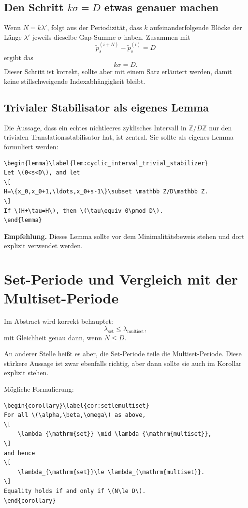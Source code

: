 \documentclass[11pt]{article}
\newcommand{\todo}[1]{\par\medskip\noindent\textbf{Empfehlung.} #1\par\medskip}
\begin{document}
\subsection{Den Schritt \texorpdfstring{\(k\sigma=D\)}{k sigma = D} etwas genauer machen}

Wenn \(N=k\lambda'\), folgt aus der Periodizität, dass \(k\) aufeinanderfolgende Blöcke der Länge \(\lambda'\) jeweils dieselbe Gap-Summe \(\sigma\) haben. Zusammen mit
\[
    \tilde p_s^{(i+N)}-\tilde p_s^{(i)}=D
\]
ergibt das
\[
    k\sigma=D.
\]
Dieser Schritt ist korrekt, sollte aber mit einem Satz erläutert werden, damit keine stillschweigende Indexabhängigkeit bleibt.

\subsection{Trivialer Stabilisator als eigenes Lemma}

Die Aussage, dass ein echtes nichtleeres zyklisches Intervall in \(\mathbb Z/D\mathbb Z\) nur den trivialen Translationsstabilisator hat, ist zentral. Sie sollte als eigenes Lemma formuliert werden:

\begin{verbatim}
\begin{lemma}\label{lem:cyclic_interval_trivial_stabilizer}
Let \(0<s<D\), and let
\[
H=\{x_0,x_0+1,\ldots,x_0+s-1\}\subset \mathbb Z/D\mathbb Z.
\]
If \(H+\tau=H\), then \(\tau\equiv 0\pmod D\).
\end{lemma}
\end{verbatim}

\todo{Dieses Lemma sollte vor dem Minimalitätsbeweis stehen und dort explizit verwendet werden.}

\section{Set-Periode und Vergleich mit der Multiset-Periode}

Im Abstract wird korrekt behauptet:
\[
    \lambda_{\mathrm{set}}\le \lambda_{\mathrm{multiset}},
\]
mit Gleichheit genau dann, wenn \(N\le D\).

An anderer Stelle heißt es aber, die Set-Periode teile die Multiset-Periode. Diese stärkere Aussage ist zwar ebenfalls richtig, aber dann sollte sie auch im Korollar explizit stehen.

Mögliche Formulierung:

\begin{verbatim}
\begin{corollary}\label{cor:setlemultiset}
For all \(\alpha,\beta,\omega\) as above,
\[
    \lambda_{\mathrm{set}} \mid \lambda_{\mathrm{multiset}},
\]
and hence
\[
    \lambda_{\mathrm{set}}\le \lambda_{\mathrm{multiset}}.
\]
Equality holds if and only if \(N\le D\).
\end{corollary}
\end{verbatim}
\end{document}

